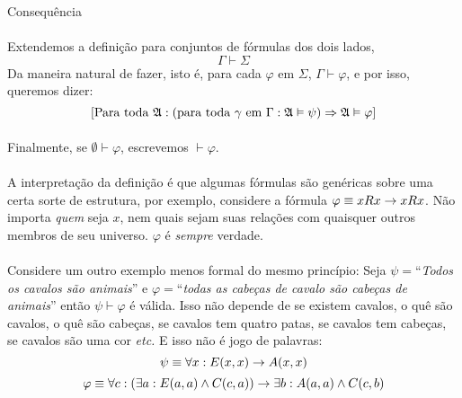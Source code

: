 \begin{definition}{Consequência}
            \paragraph{}
                Extendemos a definição para conjuntos de fórmulas dos dois 
                lados,
            $$ \Gamma\vdash\Sigma $$
                Da maneira natural de fazer, isto é, para cada $\varphi$ em $\Sigma$,
                $ \Gamma\vdash\varphi $, e por isso, queremos dizer:
            $$ [\text{Para toda }\mathfrak{A}:(\text{para toda $\gamma$ em $\Gamma$}:\mathfrak{A}\vDash\psi)\Rightarrow\mathfrak{A}\vDash\varphi]$$
            \paragraph{}
                Finalmente, se $\emptyset\vdash\varphi$, escrevemos $\vdash\varphi$.
    \end{definition}
    \paragraph{}
        A interpretação da definição é que algumas fórmulas são genéricas sobre 
        uma certa sorte de estrutura, por exemplo, considere a fórmula $\varphi\equiv 
        xRx \rightarrow xRx$. Não importa \emph{quem} seja $x$, nem quais 
        sejam suas relações com quaisquer outros membros de seu universo. 
        $\varphi$ é \emph{sempre} verdade.
    \paragraph{}
        Considere um outro exemplo menos formal do mesmo princípio: 
        Seja $\psi=$``\emph{Todos os cavalos são animais}'' e 
            $\varphi=$``\emph{todas as cabeças de cavalo são cabeças de animais}''
        então $\psi\vdash\varphi$ é válida. Isso não depende de se existem cavalos,
        o quê são cavalos, o quê são cabeças, se cavalos tem quatro patas, 
        se cavalos tem cabeças, se cavalos são uma cor \emph{etc.} E isso 
        não é jogo de palavras: 
        $$\psi\equiv\forall x: E(x,x)\rightarrow A(x,x)$$ $$\varphi\equiv\forall c: (\exists a: E(a,a)\land C(c,a))\rightarrow \exists b: A(a,a)\land C(c,b)$$
